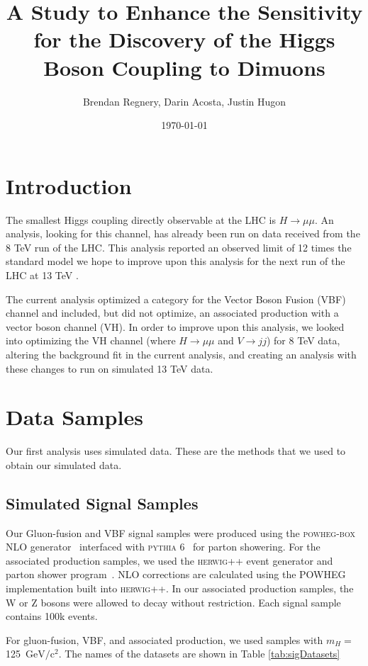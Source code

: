 \documentclass[12pt]{article}
\title{A Study to Enhance the Sensitivity for the Discovery of the Higgs Boson Coupling to Dimuons}
\author{Brendan Regnery, Darin Acosta, Justin Hugon}
\date{\today}
\begin{document}
\maketitle
 
\section{Introduction}

The smallest Higgs coupling directly observable at the LHC is $H\rightarrow \mu \mu$. 
An analysis, looking for this channel, has already been run on data received from the 8 TeV run of the LHC. 
This analysis reported an observed limit of 12 times the standard model \cite{hmumuPap} 
we hope to improve upon this analysis for the next run of the LHC at 13 TeV \cite{AN2012_459}. 

The current analysis optimized a category for the Vector Boson Fusion (VBF) channel and included, 
but did not optimize, an associated production with a vector boson channel (VH). 
In order to improve upon this analysis, we looked into optimizing the VH channel (where $H\rightarrow \mu \mu$ and $V\rightarrow jj$) for 8 TeV data, 
altering the background fit in the current analysis, and creating an analysis with these changes to run on simulated 13 TeV data.

\section{Data Samples}

Our first analysis uses simulated data. These are the methods that we used to obtain our simulated data.

\subsection{Simulated Signal Samples}

Our Gluon-fusion and VBF signal samples were produced using the \textsc{powheg-box} NLO generator~\cite{powheg1,powheg2,powheg3} 
interfaced with \textsc{pythia} 6~\cite{pythia} for parton showering.
For the associated production samples, we used the \textsc{herwig}++ event generator and 
parton shower program~\cite{herwigpp}.  NLO corrections are calculated using the 
POWHEG implementation built into \textsc{herwig}++. 
In our associated production samples, the W or Z bosons were allowed to decay without restriction.
Each signal sample contains 100k events.

For gluon-fusion, VBF, and associated production, we used samples with $m_H =$ 125~$\textrm{GeV}/\textrm{c}^{2}$. 
The names of the datasets are shown in Table \ref{tab:sigDatasets}
\end{document}
